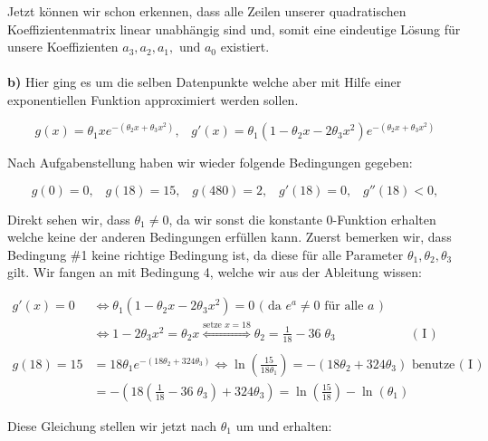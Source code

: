 \documentclass[a4paper]{article}
\begin{document}
Jetzt können wir schon erkennen, dass alle Zeilen unserer quadratischen Koeffizientenmatrix linear unabhängig
sind und, somit eine eindeutige Lösung für unsere Koeffizienten $a_3, a_2, a_1, \text{ und } a_0$ existiert. \\
\phantom{a} \\
\textbf{b)} Hier ging es um die selben Datenpunkte welche aber mit Hilfe einer exponentiellen Funktion
approximiert werden sollen.

\[
	g(x) = \theta_1 x e ^{-( \theta_2 x + \theta_3 x ^{ 2 } )},\;\;\; 
	g'(x) = \theta_1 \left( 
		1 - \theta_2 x - 2 \theta_3 x ^2
	\right) e ^{-( \theta_2x + \theta_3 x ^2 )}
\] 

Nach Aufgabenstellung haben wir wieder folgende Bedingungen gegeben:

\[
	g(0) = 0, \;\;\;
	g(18) = 15,\;\;\;
	g(480) = 2,\;\;\;
	g'(18) = 0,\;\;\;
	g''(18) < 0,
\] 

Direkt sehen wir, dass $\theta_1 \neq 0$, da wir sonst die konstante 0-Funktion erhalten
welche keine der anderen Bedingungen erfüllen kann.
Zuerst bemerken wir, dass Bedingung \#1 keine richtige Bedingung ist, da diese für alle
Parameter $\theta_1, \theta_2, \theta_3$ gilt. Wir fangen an mit Bedingung 4, welche
wir aus der Ableitung wissen:

\begin{align*}
	g'(x) = 0 &\Leftrightarrow \theta_1 \left( 
		1 - \theta_2 x - 2 \theta_3 x ^2
	\right) = 0 \text{ ( da $e ^{a} \neq 0 $ für alle $a$ )} \\
			   &\Leftrightarrow
		1 - 2 \theta_3 x ^2
	 = \theta_2 x
	 \overset{ \text{setze } x=18 } \Longleftrightarrow
	 \theta_2 = \frac{ 1 }{ 18 } - 36 \; \theta_3 \;\;\;\;\; \qquad \hspace{1cm} \text{ ( I ) }
	 \\ \\
		g(18) = 15 &= 18 \theta_1 e ^{ - (18 \theta_2 + 324 \theta_3) }
		\Leftrightarrow \ln \left( 
			\frac{ 15 }{ 18 \theta_1 }
		\right) = - \left( 
		18 \theta_2 + 324 \theta_3
	\right) \text{ benutze ( I ) } \\
				   &= - \left( 
					   18 \left( 
						   \frac{ 1 }{ 18 } - 36 \; \theta_3
					   \right) 
					   + 324 \theta_3
				   \right) 
				   = \ln \left( \frac{ 15 }{ 18 } \right)  - \ln (\theta_1)
\end{align*}

Diese Gleichung stellen wir jetzt nach $\theta_1$ um und erhalten:
\end{document}
